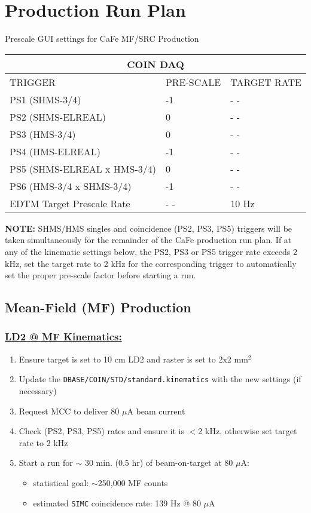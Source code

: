 \documentclass{article}
\begin{document}
\section{Production Run Plan} 
    \begin{center}
    Prescale GUI settings for CaFe MF/SRC Production
    \begin{tabular}{ |p{6cm}| |p{3cm}| |p{3cm}| }
    \hline
    \multicolumn{3}{|c|}{COIN DAQ} \\
    \hline
    TRIGGER & PRE-SCALE & TARGET RATE\\
    \hline
    PS1 (SHMS-3/4)    & -1  & - - \\
    PS2 (SHMS-ELREAL) &  0  & - - \\
    PS3 (HMS-3/4)     & 0  & - -\\
    PS4 (HMS-ELREAL)  & -1  & - - \\
    PS5 (SHMS-ELREAL x HMS-3/4)  & 0 & - -  \\
    PS6 (HMS-3/4 x SHMS-3/4)     & -1 & - -  \\
    \hline
    EDTM Target Prescale Rate & - - & 10 Hz \\
    \hline
    \end{tabular}
    \end{center}
    \textbf{NOTE:} SHMS/HMS singles and coincidence (PS2, PS3, PS5) triggers will be taken simultaneously for the remainder of the CaFe production run plan. If at any of the kinematic settings below, the PS2, PS3 or PS5 trigger rate exceeds 2 kHz, set the target rate to 2 kHz for the corresponding trigger to automatically set the proper pre-scale factor before starting a run.
\subsection{Mean-Field (MF) Production}
\subsubsection*{\underline{LD2 @ MF Kinematics:}}
\begin{enumerate}
\item Ensure target is set to 10 cm LD2 and raster is set to 2x2 mm$^{2}$
\item Update the \texttt{DBASE/COIN/STD/standard.kinematics} with the new settings (if necessary)
\item Request MCC to deliver 80 $\mu$A beam current
\item Check (PS2, PS3, PS5) rates and ensure it is $<$2 kHz, otherwise set target rate to 2 kHz
\item Start a run for $\sim$ 30 min. (0.5 hr) of beam-on-target at 80 $\mu$A:
\begin{itemize}
    \item statistical goal: $\sim$250,000 MF counts
    \item estimated \texttt{SIMC} coincidence rate: 139 Hz @ 80 $\mu$A
\end{itemize}
\end{enumerate}
\end{document}
